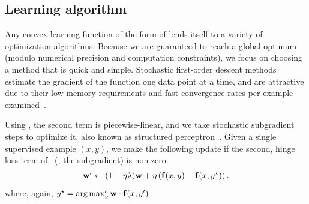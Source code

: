 \subsection{Learning algorithm}

Any convex learning function of the form of  lends itself 
to a variety of optimization algorithms.  Because we are guaranteed to reach a 
global optimum (modulo numerical precision and computation constraints), we 
focus on choosing a method that is quick and simple.  Stochastic first-order 
descent methods estimate the gradient of the function one data point at a time, 
and are attractive due to their low memory requirements and fast convergence 
rates per example examined~\citep{shalev07}.

Using , the second term is piecewise-linear, and we take stochastic 
subgradient steps to optimize it, also known as structured 
perceptron~\citep{Collins2002}. Given a single supervised example $(x,y)$, we 
make the following update if the second, hinge loss term of~ (\ie, 
the subgradient) is non-zero:
\begin{align}
\mathbf{w}' \leftarrow (1-\eta\lambda)\mathbf{w} + \eta \left( \mathbf{f}(x,y) - \mathbf{f}(x,y^\star) \right).
\end{align}
where, again, $y^\star = \mathop{\arg\max}_y' \mathbf{w} \cdot \mathbf{f}(x,y')$.
